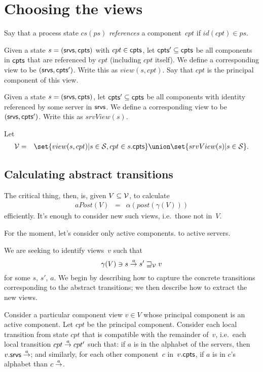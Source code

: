 
\section{Choosing the views}

Say that a process state $cs(ps)$ \emph{references} a component~$cpt$ if
$id(cpt) \in ps$. 

Given a state $s = (\mathsf{srvs}, \mathsf{cpts})$ with $cpt \in \mathsf{cpts}$, let $\mathsf{cpts}' \subseteq
\mathsf{cpts}$ be all components in $\mathsf{cpts}$ that are referenced by $cpt$ (including $cpt$
itself).  We define a corresponding view to be $(\mathsf{srvs}, \mathsf{cpts}')$.  Write this as
$view(s, cpt)$.  Say that $cpt$ is the principal component of this view. 

Given a state $s = (\mathsf{srvs}, \mathsf{cpts})$, let $\mathsf{cpts}' \subseteq
\mathsf{cpts}$ be all components with identity referenced by some server in
$\mathsf{srvs}$.  We define a corresponding view to be $(\mathsf{srvs}, \mathsf{cpts}')$.
Write this as $srvView(s)$.

Let 
\begin{eqnarray*}
\V & = & 
  \set{view(s, cpt) | s \in \S, cpt \in s.\cpt} \union 
  \set{srvView(s) | s \in \S}.
\end{eqnarray*}



\subsection{Calculating abstract transitions}

The critical thing, then, is, given $V \subseteq \mathcal{V}$, to calculate
\begin{eqnarray*}
aPost(V) & = & \alpha(post(\gamma(V)))
\end{eqnarray*}
efficiently.  It's enough to consider new such views, i.e.~those not in~$V$. 

For the moment, let's consider only active components.   to
active servers.

We are seeking to identify views~$v$ such that
\[
\gamma(V) \ni s \stackrel{a}\rightarrow s' \sqsupseteq_{\mathcal{V}} v
\]
for some $s$, $s'$, $a$.
We begin by describing how to capture the concrete transitions corresponding
to the abstract transitions; we then describe how to extract the new views. 

Consider a particular component view $v \in V$ whose principal component is an
active component.  Let $cpt$ be the principal component.  Consider each local
transition from state $cpt$ that is compatible with the remainder of~$v$,
i.e.~each local transition $cpt \stackrel{a}\rightarrow cpt'$ such that: if $a$ is in the
alphabet of the servers, then $v.\mathsf{srvs} \stackrel{a}\rightarrow$; and similarly, for each
other component~$c$ in~$v.\mathsf{cpts}$, if $a$ is in $c$'s alphabet than $c
\stackrel{a}\rightarrow$.

